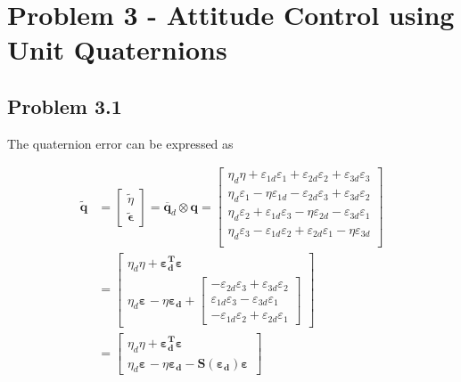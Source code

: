 \section*{Problem 3 - Attitude Control using Unit Quaternions}

\subsection*{Problem 3.1}

The quaternion error can be expressed as

\begin{equation}\label{eq:eh}
\begin{align}
\tilde{\boldsymbol{q}} &= \begin{bmatrix} \tilde{\eta} \\ \tilde{\boldsymbol{\epsilon}} \end{bmatrix} =\overline{\boldsymbol{q}}_d \otimes \boldsymbol{q} = 
\begin{bmatrix}
\eta_d\eta + \varepsilon_{1d}\varepsilon_{1}+\varepsilon_{2d}\varepsilon_{2}+\varepsilon_{3d}\varepsilon_{3}\\
\eta_d\varepsilon_{1}- \eta\varepsilon_{1d}-\varepsilon_{2d}\varepsilon_{3}+\varepsilon_{3d}\varepsilon_{2} \\
\eta_d\varepsilon_{2}+ \varepsilon_{1d}\varepsilon_{3}-\eta\varepsilon_{2d} - \varepsilon_{3d}\varepsilon_{1}\\
\eta_d\varepsilon_{3}- \varepsilon_{1d}\varepsilon_{2}+\varepsilon_{2d}\varepsilon_{1}-\eta\varepsilon_{3d}\\
\end{bmatrix}\\
&=
\begin{bmatrix}
\eta_d\eta + \boldsymbol{\varepsilon_{d}^T\varepsilon_{}}\\
\eta_d\boldsymbol{\varepsilon_{}} - \eta\boldsymbol{\varepsilon_{d}} + 
\begin{bmatrix}
-\varepsilon_{2d}\varepsilon_{3}+\varepsilon_{3d}\varepsilon_{2}\\
\varepsilon_{1d}\varepsilon_{3}-\varepsilon_{3d}\varepsilon_{1}\\
-\varepsilon_{1d}\varepsilon_{2}+\varepsilon_{2d}\varepsilon_{1}
\end{bmatrix}
\end{bmatrix}\\
&=
\begin{bmatrix}
\eta_d\eta + \boldsymbol{\varepsilon_{d}^T\varepsilon_{}}\\
\eta_d\boldsymbol{\varepsilon_{}} - \eta\boldsymbol{\varepsilon_{d}} - \boldsymbol{S}(\boldsymbol{\varepsilon_{d}})\boldsymbol{\varepsilon_{}}
\end{bmatrix}
\end{align}
\end{equation}

